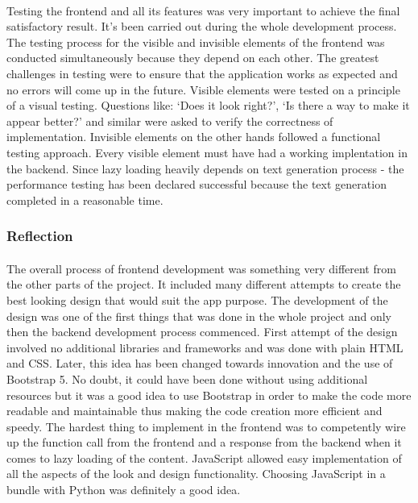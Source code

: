 \documentclass[12pt]{report}
\begin{document}
\paragraph{}
Testing the frontend and all its features was very important to achieve the final satisfactory result. It's been carried out
during the whole development process. The testing process for the visible and invisible elements of the frontend was conducted
simultaneously because they depend on each other. The greatest challenges in testing were to ensure that the application works
as expected and no errors will come up in the future. Visible elements were tested on a principle of a visual testing. 
Questions like: `Does it look right?', `Is there a way to make it appear better?' and similar were asked to verify the correctness of implementation.
Invisible elements on the other hands followed a functional testing approach. Every visible element must have had a working
implentation in the backend. Since lazy loading heavily depends on text generation process - the performance testing has been declared
successful because the text generation completed in a reasonable time. 


\subsubsection*{Reflection}
\paragraph{}
The overall process of frontend development was something very different from the other parts of the project.
It included many different attempts to create the best looking design that would suit the app purpose. The development 
of the design was one of the first things that was done in the whole project and only then the backend development process
commenced. First attempt of the design involved no additional libraries and frameworks and was done with plain HTML and CSS.
Later, this idea has been changed towards innovation and the use of Bootstrap 5. No doubt, it could have been done without 
using additional resources but it was a good idea to use Bootstrap in order to make the code more readable and maintainable thus
making the code creation more efficient and speedy. The hardest thing to implement in the frontend was to competently
wire up the function call from the frontend and a response from the backend when it comes to lazy loading of the content.
JavaScript allowed easy implementation of all the aspects of the look and design functionality. Choosing JavaScript in a bundle
with Python was definitely a good idea.
\end{document}
